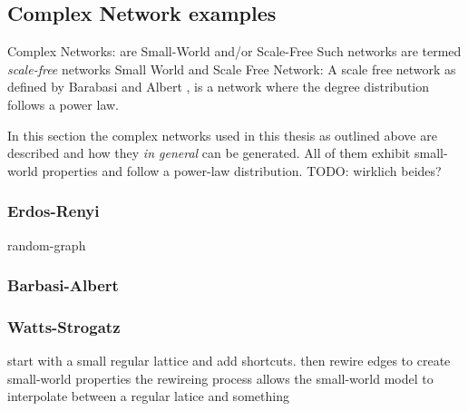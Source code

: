 \documentclass[../Bachelorarbeit.tex]{subfiles}
\begin{document}
\subsection{Complex Network examples}
Complex Networks: are Small-World and/or Scale-Free \citep{BarratWeigt_PropertiesSmallWorld} \citep{AmaralScalaStanley_ClassesSmallWorld}
Such networks are termed \textit{scale-free} networks \cite{BarabasiAlbert_EmergenceScaling}
Small World and Scale Free Network:  A scale free network as defined by Barabasi and Albert \citep{BarabasiAlbert_EmergenceScaling}, is a network where the degree distribution follows a power law.

In this section the complex networks used in this thesis as outlined above are described and how they \textit{in general} can be generated. All of them exhibit small-world properties and follow a power-law distribution. TODO: wirklich beides?

\subsubsection{Erdos-Renyi}
random-graph

\subsubsection{Barbasi-Albert}
\cite{BarabasiAlbert_EmergenceScaling}

\subsubsection{Watts-Strogatz}
\cite{WattsStrogatz_DynamicsSmallWorld}

start with a small regular lattice and add shortcuts.
then rewire edges to create small-world properties
the rewireing process allows the small-world model to interpolate between a regular latice and something 
\end{document}
